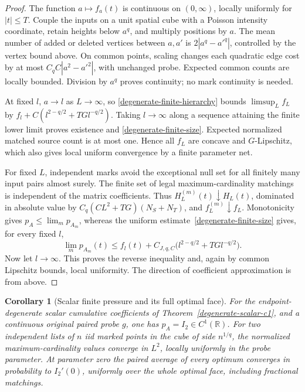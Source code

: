 \documentclass[11pt,reqno]{amsart}
\newtheorem{corollary}[theorem]{Corollary}
\theoremstyle{definition}
\theoremstyle{remark}
\numberwithin{equation}{section}
\newcommand{\R}{\mathbb R}
\begin{document}
\begin{proof}
The function \(a\mapsto f_a(t)\) is continuous on \((0,\infty)\),
locally uniformly for \(|t|\le T\). Couple the inputs on a unit spatial
cube with a Poisson intensity coordinate, retain heights below \(a^q\),
and multiply positions by \(a\). The mean number of added or deleted
vertices between \(a,a'\) is \(2|a^q-a'^q|\), controlled by the vertex
bound above. On common points, scaling changes each quadratic edge cost
by at most \(C_qC|a^2-a'^2|\), with unchanged probe. Expected common
counts are locally bounded. Division by \(a^q\) proves continuity;
no mark continuity is needed.

At fixed \(l\), \(a\to l\) as \(L\to\infty\), so
\eqref{degenerate-finite-hierarchy} bounds \(\limsup_L f_L\) by
\(f_l+C(l^{2-q/2}+TG l^{-q/2})\). Taking \(l\to\infty\) along
a sequence attaining the finite lower limit proves existence and
\eqref{degenerate-finite-size}. Expected normalized matched source count
is at most one. Hence all \(f_L\) are concave and \(G\)-Lipschitz,
which also gives local uniform convergence by a finite parameter net.

For fixed \(L\), independent marks avoid the exceptional null set for
all finitely many input pairs almost surely. The finite set of legal
maximum-cardinality matchings is independent of the matrix coefficients.
Thus \(H_L^{(m)}(t)\downarrow H_L(t)\), dominated in absolute value by
\(C_q(CL^2+TG)(N_S+N_T)\), and \(f_L^{(m)}\downarrow f_L\).
Monotonicity gives \(p_A\le\lim_m p_{A_m}\), whereas the uniform
estimate~\eqref{degenerate-finite-size} gives, for every fixed \(l\),
\[
 \lim_m p_{A_m}(t)\le f_l(t)+C_{J,q,C}
                   \bigl(l^{2-q/2}+TG l^{-q/2}\bigr).
\]
Now let \(l\to\infty\). This proves the reverse inequality and,
again by common Lipschitz bounds, local uniformity. The direction of
coefficient approximation is from above.
\end{proof}

\begin{corollary}[Scalar finite pressure and its full optimal face]
\label{degenerate-finite-readout}
For the endpoint-degenerate scalar cumulative coefficients of
Theorem~\ref{degenerate-scalar-c1}, and a continuous original paired
probe \(g\), one has \(p_A=I_2\in C^1(\R)\). For two independent
lists of \(n\) iid marked points in the cube of side \(n^{1/q}\),
the normalized maximum-cardinality values converge in \(L^2\), locally
uniformly in the probe parameter. At parameter zero the paired average
of every optimum converges in probability to \(I_2'(0)\), uniformly
over the whole optimal face, including fractional matchings.
\end{corollary}
\end{document}
